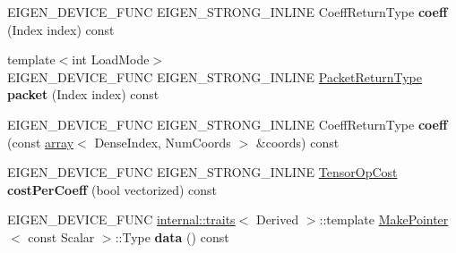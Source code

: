 \begin{DoxyCompactItemize}
\mbox{\label{struct_eigen_1_1_tensor_evaluator_3_01const_01_derived_00_01_device_01_4_ad111d3510f1085df9cbfc8c0d914421b}} 
E\+I\+G\+E\+N\+\_\+\+D\+E\+V\+I\+C\+E\+\_\+\+F\+U\+NC E\+I\+G\+E\+N\+\_\+\+S\+T\+R\+O\+N\+G\+\_\+\+I\+N\+L\+I\+NE Coeff\+Return\+Type {\bfseries coeff} (Index index) const
\item 
\mbox{\label{struct_eigen_1_1_tensor_evaluator_3_01const_01_derived_00_01_device_01_4_a893c096407edf69c98665f81e814b1fa}} 
{\footnotesize template$<$int Load\+Mode$>$ }\\E\+I\+G\+E\+N\+\_\+\+D\+E\+V\+I\+C\+E\+\_\+\+F\+U\+NC E\+I\+G\+E\+N\+\_\+\+S\+T\+R\+O\+N\+G\+\_\+\+I\+N\+L\+I\+NE \hyperlink{group___sparse_core___module}{Packet\+Return\+Type} {\bfseries packet} (Index index) const
\item 
\mbox{\label{struct_eigen_1_1_tensor_evaluator_3_01const_01_derived_00_01_device_01_4_a3bd2544ac94201d32e291c734208870d}} 
E\+I\+G\+E\+N\+\_\+\+D\+E\+V\+I\+C\+E\+\_\+\+F\+U\+NC E\+I\+G\+E\+N\+\_\+\+S\+T\+R\+O\+N\+G\+\_\+\+I\+N\+L\+I\+NE Coeff\+Return\+Type {\bfseries coeff} (const \hyperlink{class_eigen_1_1array}{array}$<$ Dense\+Index, Num\+Coords $>$ \&coords) const
\item 
\mbox{\label{struct_eigen_1_1_tensor_evaluator_3_01const_01_derived_00_01_device_01_4_a44668d5954b4c921409b6e5e7fdf8cb5}} 
E\+I\+G\+E\+N\+\_\+\+D\+E\+V\+I\+C\+E\+\_\+\+F\+U\+NC E\+I\+G\+E\+N\+\_\+\+S\+T\+R\+O\+N\+G\+\_\+\+I\+N\+L\+I\+NE \hyperlink{class_eigen_1_1_tensor_op_cost}{Tensor\+Op\+Cost} {\bfseries cost\+Per\+Coeff} (bool vectorized) const
\item 
\mbox{\label{struct_eigen_1_1_tensor_evaluator_3_01const_01_derived_00_01_device_01_4_a7116f5a2d0edcc46589cbe53910bff7c}} 
E\+I\+G\+E\+N\+\_\+\+D\+E\+V\+I\+C\+E\+\_\+\+F\+U\+NC \hyperlink{struct_eigen_1_1internal_1_1traits}{internal\+::traits}$<$ Derived $>$\+::template \hyperlink{struct_eigen_1_1_make_pointer}{Make\+Pointer}$<$ const Scalar $>$\+::Type {\bfseries data} () const

\end{DoxyCompactItemize}
